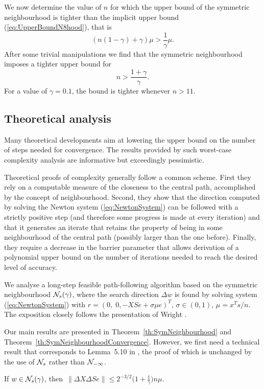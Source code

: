 We now determine the value of $n$ for which the upper bound of
the symmetric neighbourhood is tighter than the implicit upper bound
(\ref{eq:UpperBoundN8hood}), that is
\[
  (n(1-\gamma) + \gamma)\mu > \frac{1}{\gamma}\mu.
\]
After some trivial manipulations we find that
the symmetric neighbourhood imposes a tighter upper bound
for
\[
  n > \frac{1+\gamma}{\gamma}.
\]
For a value of $\gamma = 0.1$, the bound is tighter whenever
$n > 11$.

%
%
\subsection{Theoretical analysis}

Many theoretical developments aim at lowering the upper bound on the number 
of steps needed for convergence. The results provided by such worst-case 
complexity analysis are informative but exceedingly pessimistic. 

Theoretical proofs of complexity generally follow a common scheme.
First they rely on a computable measure of the closeness to the central
path, accomplished by the concept of neighbourhood. Second,
they show that the direction computed by solving the Newton system
(\ref{eq:NewtonSystem}) can be followed with a strictly positive step
(and therefore some progress is made at every iteration) 
and that it generates an iterate 
that retains the property of being in some neighbourhood of the central 
path (possibly larger than the one before). Finally, they require
a decrease in the barrier parameter that allows derivation 
of a polynomial upper
bound on the number of iterations needed to reach the desired
level of accuracy.

We analyse a long-step feasible path-following 
algorithm based on the symmetric neighbourhood $\mathcal{N}_s(\gamma)$, 
where the search direction $\Delta w$ 
is found by solving system (\ref{eq:NewtonSystem}) with 
$r=(0,\; 0,-XSe+\sigma\mu e)^T$, $\sigma\in(0,1)$, $\mu=x^Ts/n$.
The exposition closely follows the presentation of Wright
\cite[Chapter~5]{ipm:Wright97}. 

Our main results are presented in Theorem~\ref{th:SymNeighbourhood}
and Theorem~\ref{th:SymNeighbourhoodConvergence}.
However, we first need a technical result that corresponds to
Lemma~5.10 in \cite{ipm:Wright97}, the proof of which is unchanged by the use 
of $\mathcal{N}_s$ rather than $\mathcal{N}_{-\infty}$.
%
\begin{lemma} \label{Wright:5.10}
If $w \in \mathcal{N}_s(\gamma)$, then\,
\(
  \|\Delta X\Delta Se\| \le 2^{-3/2}
                        \Big( 1+ \displaystyle{\frac{1}{\gamma}} \Big)n\mu.
\)
\end{lemma}

